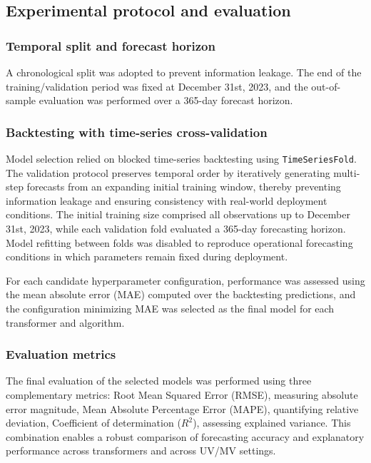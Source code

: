 \subsection{Experimental protocol and evaluation}
\label{subsec:experimental_setup}

\subsubsection{Temporal split and forecast horizon}
A chronological split was adopted to prevent information leakage. The end of the training/validation period was fixed at December 31st, 2023, and the out-of-sample evaluation was performed over a 365-day forecast horizon.

\subsubsection{Backtesting with time-series cross-validation}

Model selection relied on blocked time-series backtesting using \texttt{TimeSeriesFold}. The validation protocol preserves temporal order by iteratively generating multi-step forecasts from an expanding initial training window, thereby preventing information leakage and ensuring consistency with real-world deployment conditions. The initial training size comprised all observations up to December 31st, 2023, while each validation fold evaluated a 365-day forecasting horizon. Model refitting between folds was disabled to reproduce operational forecasting conditions in which parameters remain fixed during deployment.

For each candidate hyperparameter configuration, performance was assessed using the mean absolute error (MAE) computed over the backtesting predictions, and the configuration minimizing MAE was selected as the final model for each transformer and algorithm.


\subsubsection{Evaluation metrics}
The final evaluation of the selected models was performed using three complementary metrics: Root Mean Squared Error (RMSE), measuring absolute error magnitude, Mean Absolute Percentage Error (MAPE), quantifying relative deviation, Coefficient of determination ($R^2$), assessing explained variance. This combination enables a robust comparison of forecasting accuracy and explanatory performance across transformers and across UV/MV settings.

